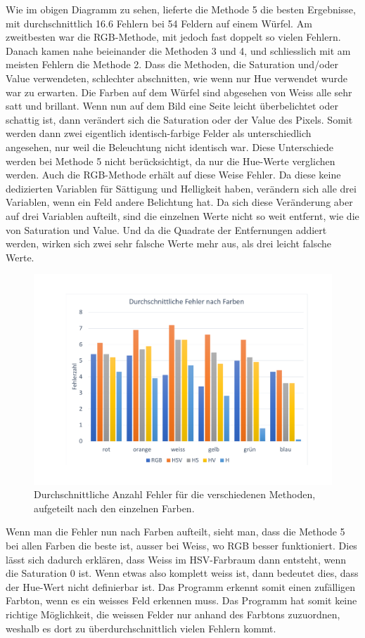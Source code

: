 \documentclass[a4paper, 12pt]{article}
\begin{document}
Wie im obigen Diagramm zu sehen, lieferte die Methode 5 die besten Ergebnisse, mit durchschnittlich 16.6 Fehlern bei 54 Feldern auf einem Würfel. Am zweitbesten war die RGB-Methode, mit jedoch fast doppelt so vielen Fehlern. Danach kamen nahe beieinander die Methoden 3 und 4, und schliesslich mit am meisten Fehlern die Methode 2. Dass die Methoden, die Saturation und/oder Value verwendeten, schlechter abschnitten, wie wenn nur Hue verwendet wurde war zu erwarten. Die Farben auf dem Würfel sind abgesehen von Weiss alle sehr satt und brillant. Wenn nun auf dem Bild eine Seite leicht überbelichtet oder schattig ist, dann verändert sich die Saturation oder der Value des Pixels. Somit werden dann zwei eigentlich identisch-farbige Felder als unterschiedlich angesehen, nur weil die Beleuchtung nicht identisch war. Diese Unterschiede werden bei Methode 5 nicht berücksichtigt, da nur die Hue-Werte verglichen werden. Auch die RGB-Methode erhält auf diese Weise Fehler. Da diese keine dedizierten Variablen für Sättigung und Helligkeit haben, verändern sich alle drei Variablen, wenn ein Feld andere Belichtung hat. Da sich diese Veränderung aber auf drei Variablen aufteilt, sind die einzelnen Werte nicht so weit entfernt, wie die von Saturation und Value. Und da die Quadrate der Entfernungen addiert werden, wirken sich zwei sehr falsche Werte mehr aus, als drei leicht falsche Werte. 
\begin{figure}[H]
\includegraphics[scale=0.4]{durchschnittliche_Fehler_nach_Farben}
\caption{Durchschnittliche Anzahl Fehler für die verschiedenen Methoden, aufgeteilt nach den einzelnen Farben.}
\end{figure}
Wenn man die Fehler nun nach Farben aufteilt, sieht man, dass die Methode 5 bei allen Farben die beste ist, ausser bei Weiss, wo RGB besser funktioniert. Dies lässt sich dadurch erklären, dass Weiss im HSV-Farbraum dann entsteht, wenn die Saturation 0 ist. Wenn etwas also komplett weiss ist, dann bedeutet dies, dass der Hue-Wert nicht definierbar ist. Das Programm erkennt somit einen zufälligen Farbton, wenn es ein weisses Feld erkennen muss. Das Programm hat somit keine richtige Möglichkeit, die weissen Felder nur anhand des Farbtons zuzuordnen, weshalb es dort zu überdurchschnittlich vielen Fehlern kommt. 
\end{document}
